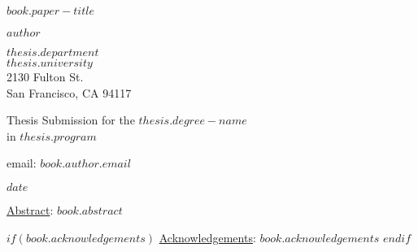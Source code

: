 \pagestyle{empty}

\begin{titlepage}
\singlespacing
\begin{center}
\Huge
{\bf {$book.paper-title$}}

\vspace*{2.0cm}


{\Large {$author$}}

\vspace*{0.5cm}

\normalsize
$thesis.department$\\
$thesis.university$\\
2130 Fulton St.\\
San Francisco, CA 94117\\

\vspace*{0.5cm}

\normalsize
Thesis Submission for the $thesis.degree-name$\\
in $thesis.program$\\

\vspace*{0.5cm}

\normalsize
email: \textit{$book.author.email$}\\

\vspace*{0.5cm}

{\normalsize $date$}

\vspace*{2.0cm}

\begin{flushleft}

\normalsize \underline{Abstract}: $book.abstract$

$if(book.acknowledgements)$
  \vspace*{0.5cm}
  {\normalsize \underline{Acknowledgements}: $book.acknowledgements$}
$endif$

\end{flushleft}


\end{center}
\end{titlepage}

